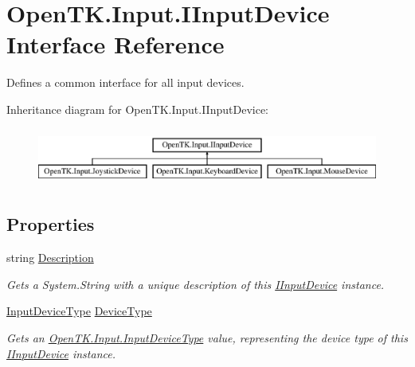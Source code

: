 \hypertarget{interface_open_t_k_1_1_input_1_1_i_input_device}{\section{Open\-T\-K.\-Input.\-I\-Input\-Device Interface Reference}
\label{interface_open_t_k_1_1_input_1_1_i_input_device}
}


Defines a common interface for all input devices.  


Inheritance diagram for Open\-T\-K.\-Input.\-I\-Input\-Device\-:\begin{figure}[H]
\begin{center}
\leavevmode
\includegraphics[height=1.904762cm]{interface_open_t_k_1_1_input_1_1_i_input_device}
\end{center}
\end{figure}
\subsection*{Properties}
\begin{DoxyCompactItemize}
\item 
string \hyperlink{interface_open_t_k_1_1_input_1_1_i_input_device_ae119526b3cf39957b3f0440cf50122f2}{Description}
\begin{DoxyCompactList}\small\item\em Gets a System.\-String with a unique description of this \hyperlink{interface_open_t_k_1_1_input_1_1_i_input_device}{I\-Input\-Device} instance. \end{DoxyCompactList}\item 
\hyperlink{namespace_open_t_k_1_1_input_a1d147c6256b0adaa5288eec90ed93270}{Input\-Device\-Type} \hyperlink{interface_open_t_k_1_1_input_1_1_i_input_device_a5be985412e36d169ff3cf4902eb6b2f3}{Device\-Type}
\begin{DoxyCompactList}\small\item\em Gets an \hyperlink{namespace_open_t_k_1_1_input_a1d147c6256b0adaa5288eec90ed93270}{Open\-T\-K.\-Input.\-Input\-Device\-Type} value, representing the device type of this \hyperlink{interface_open_t_k_1_1_input_1_1_i_input_device}{I\-Input\-Device} instance. \end{DoxyCompactList}\end{DoxyCompactItemize}


